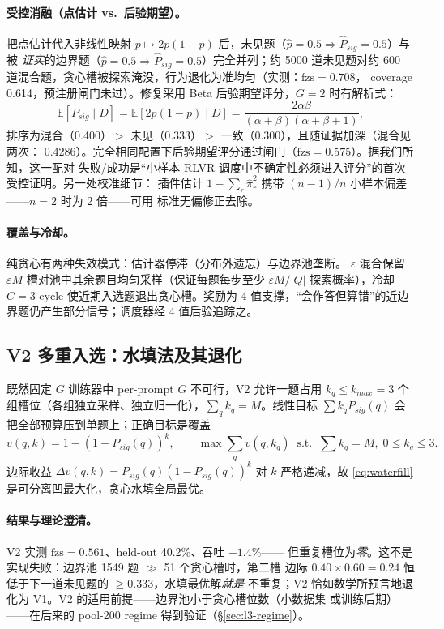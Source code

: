 \documentclass[11pt]{article}
\theoremstyle{definition}
\newcommand{\fzs}{\text{fzs}}
\begin{document}
\paragraph{受控消融（点估计 vs.\ 后验期望）。}把点估计代入非线性映射
$p\mapsto2p(1-p)$ 后，未见题（$\hat p{=}0.5\Rightarrow\hat P_{sig}{=}0.5$）与被
\emph{证实}的边界题（$\hat p{=}0.5\Rightarrow\hat P_{sig}{=}0.5$）完全并列；约 5000
道未见题对约 600 道混合题，贪心槽被探索淹没，行为退化为准均匀（实测：$\fzs{=}0.708$，
coverage 0.614，预注册闸门未过）。修复采用 Beta 后验期望评分，$G{=}2$ 时有解析式：
\begin{equation}\label{eq:posterior}
\mathbb{E}[P_{sig}\mid D]
= \mathbb{E}[2p(1-p)\mid D]
= \frac{2\alpha\beta}{(\alpha+\beta)(\alpha+\beta+1)},
\end{equation}
排序为混合（0.400）$>$ 未见（0.333）$>$ 一致（0.300），且随证据加深（混合见两次：
0.4286）。完全相同配置下后验期望评分通过闸门（$\fzs{=}0.575$）。据我们所知，这一配对
失败/成功是“小样本 RLVR 调度中不确定性必须进入评分”的首次受控证明。另一处校准细节：
插件估计 $1-\sum_r\hat\pi_r^2$ 携带 $(n{-}1)/n$ 小样本偏差——$n{=}2$ 时为 2 倍——可用
标准无偏修正去除。

\paragraph{覆盖与冷却。}纯贪心有两种失效模式：估计器停滞（分布外遗忘）与边界池垄断。
$\varepsilon$ 混合保留 $\varepsilon M$ 槽对池中其余题目均匀采样（保证每题每步至少
$\varepsilon M/|Q|$ 探索概率），冷却 $C{=}3$ cycle 使近期入选题退出贪心槽。奖励为
4 值支撑，“会作答但算错”的近边界题仍产生部分信号；调度器经 4 值后验追踪之。

\subsection{V2 多重入选：水填法及其退化}\label{sec:l2-v2}
既然固定 $G$ 训练器中 per-prompt $G$ 不可行，V2 允许一题占用 $k_q\le k_{max}{=}3$
个组槽位（各组独立采样、独立归一化），$\sum_q k_q = M$。线性目标
$\sum k_q P_{sig}(q)$ 会把全部预算压到单题上；正确目标是覆盖
\begin{equation}\label{eq:waterfill}
v(q,k) = 1-(1-P_{sig}(q))^{k}, \qquad
\max \sum_q v(q,k_q)\;\; \text{s.t.}\;\; \sum k_q=M,\; 0\le k_q\le 3 .
\end{equation}
边际收益 $\Delta v(q,k)=P_{sig}(q)(1-P_{sig}(q))^{k}$ 对 $k$ 严格递减，故
\eqref{eq:waterfill} 是可分离凹最大化，贪心水填全局最优。

\paragraph{结果与理论澄清。}V2 实测 $\fzs{=}0.561$、held-out 40.2\%、吞吐 $-1.4\%$——
但重复槽位为\emph{零}。这不是实现失败：边界池 1549 题 $\gg$ 51 个贪心槽时，第二槽
边际 $0.40\times0.60{=}0.24$ 恒低于下一道未见题的 $\ge0.333$，水填最优解\emph{就是}
不重复；V2 恰如数学所预言地退化为 V1。V2 的适用前提——边界池小于贪心槽位数（小数据集
或训练后期）——在后来的 pool-200 regime 得到验证（\S\ref{sec:l3-regime}）。
\end{document}
